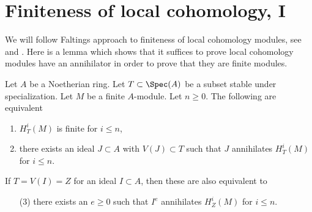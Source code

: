 \section{Finiteness of local cohomology, I}
\label{section-finiteness}

\noindent
We will follow Faltings approach to finiteness of local cohomology
modules, see \cite{Faltings-annulators} and \cite{Faltings-finiteness}.
Here is a lemma which shows that it suffices to prove
local cohomology modules have an annihilator in order to prove that
they are finite modules.

\begin{lemma}
\label{lemma-check-finiteness-local-cohomology-by-annihilator}
\begin{reference}
\cite[Lemma 3]{Faltings-annulators}
\end{reference}
Let $A$ be a Noetherian ring. Let $T \subset \Spec(A)$ be a subset stable
under specialization. Let $M$ be a finite $A$-module. Let $n \geq 0$.
The following are equivalent
\begin{enumerate}
\item $H^i_T(M)$ is finite for $i \leq n$,
\item there exists an ideal $J \subset A$ with $V(J) \subset T$
such that $J$ annihilates $H^i_T(M)$ for $i \leq n$.
\end{enumerate}
If $T = V(I) = Z$ for an ideal $I \subset A$, then these are also
equivalent to
\begin{enumerate}
\item[(3)] there exists an $e \geq 0$ such that $I^e$ annihilates
$H^i_Z(M)$ for $i \leq n$.
\end{enumerate}
\end{lemma}

